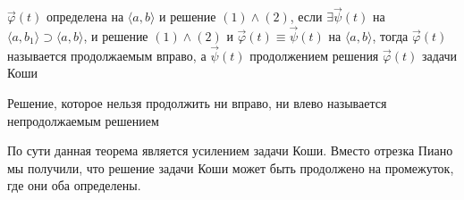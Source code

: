     \begin{definition} 
        $\Vec{\varphi}(t)$ определена на $\langle a, b\rangle$ и решение $(1) \wedge (2)$, если $\exists \Vec{\psi}(t)$ на $\langle a, b_1\rangle \supset \langle a, b\rangle$, и решение $(1) \wedge (2)$ и $\Vec{\varphi}(t) \equiv \Vec{\psi}(t)$ на $\langle a, b\rangle$, тогда $\Vec{\varphi}(t)$ называется продолжаемым вправо, а $\Vec{\psi}(t)$ продолжением решения $\Vec{\varphi}(t)$ задачи Коши
    \end{definition}
    
    \begin{definition} 
        Решение, которое нельзя продолжить ни вправо, ни влево называется непродолжаемым решением
    \end{definition}
    
    \begin{remark}
        По сути данная теорема является усилением задачи Коши. Вместо отрезка Пиано мы получили, что решение задачи Коши может быть продолжено на промежуток, где они оба определены.
    \end{remark}
    
